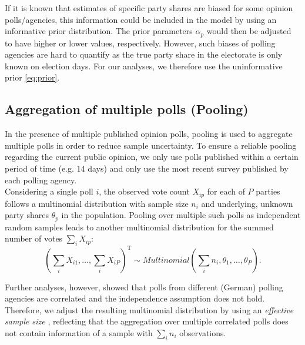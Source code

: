 \documentclass[smallcondensed]{svjour3}     %
\newcommand{\T}{\mathrm{\scriptscriptstyle T}}
\begin{document}
If it is known that estimates of specific party shares are biased for some opinion
polls/agencies, this information could be included in the model by using an
informative prior distribution. The prior parameters $\alpha_p$ would then
be adjusted to have higher or lower values, respectively.
However, such biases of polling agencies are hard to quantify as the true party
share in the electorate is only known on election days. For our analyses, we
therefore use the uninformative prior \eqref{eq:prior}.

\subsection{Aggregation of multiple polls (Pooling)} \label{ssec:pooling}
In the presence of multiple published opinion polls, pooling is used to
aggregate multiple polls in order to reduce sample uncertainty. To ensure a
reliable pooling regarding the current public opinion, we only use polls
published within a certain period of time (e.g. 14 days)  and only use the most recent survey published by each polling agency.\\

Considering a single poll $i$, the observed vote count $X_{ip}$ for each of
$P$ parties follows a multinomial distribution with sample size $n_i$ and underlying,
unknown party shares $\theta_p$ in the population.
Pooling over multiple such polls as independent random samples leads to another
multinomial distribution for the summed number of votes $\sum_i X_{ip}$:
\begin{equation}
\left( \sum\limits_i X_{i1},\ldots, \sum\limits_i X_{iP} \right)^\T
  \sim Multinomial \left( \sum\limits_i n_i,\theta_1,\ldots,\theta_P\right).
\end{equation}

Further analyses, however, showed that polls from different (German) polling
agencies are correlated and the independence assumption does not hold. Therefore,
we adjust the resulting multinomial distribution by using an
\textit{effective sample size} \citep{hanley_2003}, reflecting that the aggregation
over multiple correlated polls does not contain information of a sample with
$\sum_i n_i$ observations.\\
\end{document}
